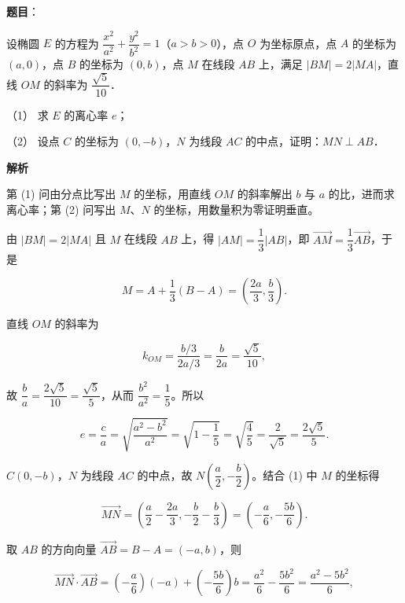 \begin{answer}

\textbf{题目}：

设椭圆 \(E\) 的方程为 \(\dfrac{x^2}{a^2}+\dfrac{y^2}{b^2}=1\)（\(a>b>0\)），点 \(O\) 为坐标原点，点 \(A\) 的坐标为 \((a,0)\)，点 \(B\) 的坐标为 \((0,b)\)，点 \(M\) 在线段 \(AB\) 上，满足 \(|BM|=2|MA|\)，直线 \(OM\) 的斜率为 \(\dfrac{\sqrt{5}}{10}\)．

（1） 求 \(E\) 的离心率 \(e\)；

（2） 设点 \(C\) 的坐标为 \((0,-b)\)，\(N\) 为线段 \(AC\) 的中点，证明：\(MN\perp AB\)．

\textbf{解析}

第 (1) 问由分点比写出 \(M\) 的坐标，用直线 \(OM\) 的斜率解出 \(b\) 与 \(a\) 的比，进而求离心率；第 (2) 问写出 \(M\)、\(N\) 的坐标，用数量积为零证明垂直。


由 \(|BM|=2|MA|\) 且 \(M\) 在线段 \(AB\) 上，得 \(|AM|=\dfrac{1}{3}|AB|\)，即 \(\overrightarrow{AM}=\dfrac{1}{3}\overrightarrow{AB}\)，于是

\nopagebreak[4]
\[
M=A+\dfrac{1}{3}(B-A)=\left(\dfrac{2a}{3},\dfrac{b}{3}\right).
\]

直线 \(OM\) 的斜率为

\nopagebreak[4]
\[
k_{OM}=\dfrac{b/3}{2a/3}=\dfrac{b}{2a}=\dfrac{\sqrt{5}}{10},
\]

故 \(\dfrac{b}{a}=\dfrac{2\sqrt{5}}{10}=\dfrac{\sqrt{5}}{5}\)，从而 \(\dfrac{b^2}{a^2}=\dfrac{1}{5}\)。所以

\nopagebreak[4]
\[
e=\dfrac{c}{a}=\sqrt{\dfrac{a^2-b^2}{a^2}}=\sqrt{1-\dfrac{1}{5}}=\sqrt{\dfrac{4}{5}}=\dfrac{2}{\sqrt{5}}=\dfrac{2\sqrt{5}}{5}.
\]


\(C(0,-b)\)，\(N\) 为线段 \(AC\) 的中点，故 \(N\left(\dfrac{a}{2},-\dfrac{b}{2}\right)\)。结合 (1) 中 \(M\) 的坐标得

\nopagebreak[4]
\[
\overrightarrow{MN}=\left(\dfrac{a}{2}-\dfrac{2a}{3},-\dfrac{b}{2}-\dfrac{b}{3}\right)=\left(-\dfrac{a}{6},-\dfrac{5b}{6}\right).
\]

取 \(AB\) 的方向向量 \(\overrightarrow{AB}=B-A=(-a,b)\)，则

\nopagebreak[4]
\[
\overrightarrow{MN}\cdot\overrightarrow{AB}=\left(-\dfrac{a}{6}\right)(-a)+\left(-\dfrac{5b}{6}\right)b=\dfrac{a^2}{6}-\dfrac{5b^2}{6}=\dfrac{a^2-5b^2}{6},
\]


\end{answer}

